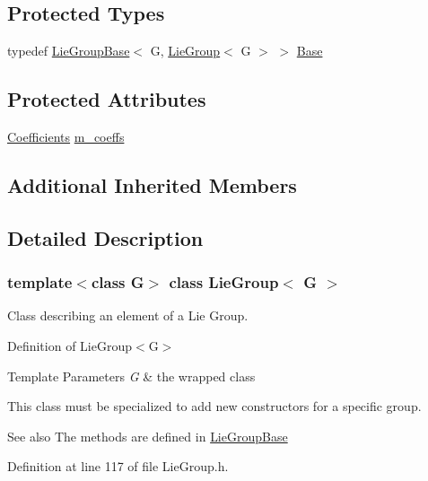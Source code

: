 \subsection*{Protected Types}
\begin{DoxyCompactItemize}
\item 
typedef \hyperlink{class_lie_group_base}{Lie\+Group\+Base}$<$ G, \hyperlink{class_lie_group}{Lie\+Group}$<$ G $>$ $>$ \hyperlink{class_lie_group_aac708f8905d0a77bbe8c9bae8c6ac525}{Base}
\end{DoxyCompactItemize}
\subsection*{Protected Attributes}
\begin{DoxyCompactItemize}
\item 
\hyperlink{class_lie_group_a52de3c5adb933cbfa694b51bef656d5d}{Coefficients} \hyperlink{class_lie_group_a8a312c03fa7d4fed55b4c26d4fe3057a}{m\+\_\+coeffs}
\end{DoxyCompactItemize}
\subsection*{Additional Inherited Members}


\subsection{Detailed Description}
\subsubsection*{template$<$class G$>$\newline
class Lie\+Group$<$ G $>$}

Class describing an element of a Lie Group. 

Definition of Lie\+Group$<$\+G$>$


\begin{DoxyTemplParams}{Template Parameters}
{\em G} & the wrapped class\\
\hline
\end{DoxyTemplParams}
This class must be specialized to add new constructors for a specific group.

\begin{DoxySeeAlso}{See also}
The methods are defined in \hyperlink{class_lie_group_base}{Lie\+Group\+Base} 
\end{DoxySeeAlso}


Definition at line 117 of file Lie\+Group.\+h.



